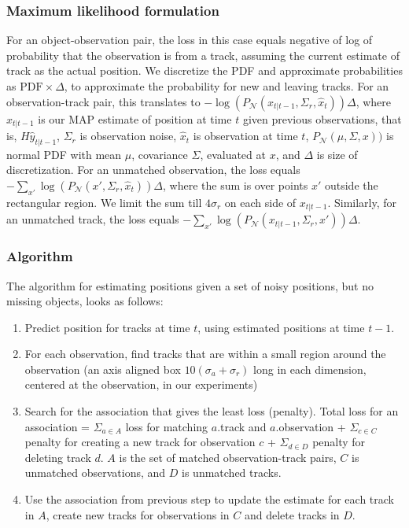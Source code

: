\documentclass[a4paper]{article}
\newcommand{\N}{\mathcal{N}}
\newcommand{\x}{\hat{x}}
\newcommand{\y}{\hat{y}}
\begin{document}
\subsubsection{Maximum likelihood formulation}
For an object-observation pair, the loss in this case equals negative of log of
probability that the observation is from a track, assuming the current estimate of
track as the actual position.
We discretize the PDF and approximate probabilities as $\text{PDF} \times \Delta$,
to approximate the probability for new and leaving tracks.
For an observation-track pair, this translates to
$-\log(P_\N(x_{t|t-1}, \Sigma_r, \x_t)) \Delta$,
where $x_{t|t-1}$ is our MAP estimate of position at time $t$ given previous
observations, that is,
$H \y_{t|t-1}$,
$\Sigma_r$ is observation noise, $\x_t$ is observation at time $t$,
$P_\N(\mu, \Sigma, x))$ is normal PDF with mean $\mu$,
covariance $\Sigma$, evaluated at $x$, and $\Delta$ is size of discretization.
For an unmatched observation, the loss equals
$- \sum_{x'} \log(P_\N(x', \Sigma_r, \x_t)) \Delta$, where the sum is over
points $x'$ outside the rectangular region.
We limit the sum till $4\sigma_r$ on each side of $x_{t|t-1}$.
Similarly, for an unmatched track, the loss equals
$- \sum_{x'} \log(P_\N(x_{t|t-1}, \Sigma_r, x')) \Delta$.

\subsubsection{Algorithm}
The algorithm for estimating positions given a set of noisy positions, but
no missing objects, looks as follows:
\begin{enumerate}[itemsep=0mm]
\item Predict position for tracks at time $t$, using estimated positions at time $t-1$.
\item For each observation, find tracks that are within a small region around the 
observation
(an axis aligned box $10 (\sigma_a + \sigma_r)$ long in each dimension,
centered at the observation, in our experiments)
\item Search for the association that gives the least loss (penalty).
Total loss for an association =
  $\Sigma_{a \in A}$ loss for matching $a.$track and $a.$observation +
  $\Sigma_{c \in C}$ penalty for creating a new track for observation $c$ +
  $\Sigma_{d \in D}$ penalty for deleting track $d$.
$A$ is the set of matched observation-track pairs, $C$ is unmatched observations, and
$D$ is unmatched tracks.
\item Use the association from previous step to update the estimate for each track in $A$, create new tracks for observations in $C$ and delete tracks in $D$.
\end{enumerate}
\end{document}
